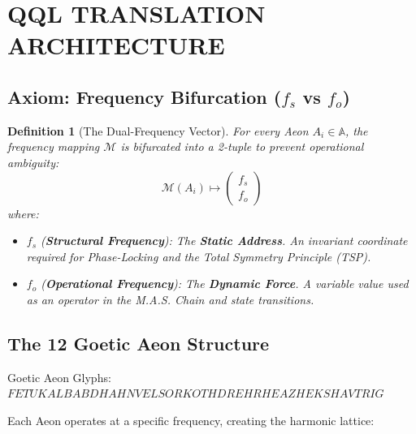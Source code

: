 \documentclass[11pt, letterpaper]{article}
\newcommand{\FETU}{\ensuremath{\mathop{\textnormal{\thaanafont\symbol{"23E3}}}}}   %
\newcommand{\KAL}{\ensuremath{\mathop{\textnormal{\symbolafont\symbol{"29C9}}}}}    %
\newcommand{\BABDH}{\ensuremath{\mathop{\textnormal{\symbolafont\symbol{"2316}}}}}   %
\newcommand{\AHN}{\ensuremath{\mathop{\textnormal{\symbolafont\symbol{"27C1}}}}}    %
\newcommand{\VEL}{\ensuremath{\mathop{\textnormal{\symbolafont\symbol{"2734}}}}}    %
\newcommand{\SOR}{\ensuremath{\mathop{\textnormal{\symbolafont\symbol{"229B}}}}}    %
\newcommand{\KOTH}{\ensuremath{\mathop{\textnormal{\symbolafont\symbol{"1F702}}}}}  %
\newcommand{\DREH}{\ensuremath{\mathop{\textnormal{\symbolafont\symbol{"29D7}}}}}   %
\newcommand{\RHEA}{\ensuremath{\mathop{\textnormal{\symbolafont\symbol{"2A54}}}}}   %
\newcommand{\ZHEK}{\ensuremath{\mathop{\textnormal{\symbolafont\symbol{"25C8}}}}}   %
\newcommand{\SHAV}{\ensuremath{\mathop{\textnormal{\symbolafont\symbol{"2742}}}}}   %
\newcommand{\TRIG}{\ensuremath{\mathop{\textnormal{\tifinaghfont\symbol{"2D63}}}}}    %
\def\FETU{FETU}%
\def\KAL{KAL}%
\def\BABDH{BABDH}%
\def\AHN{AHN}%
\def\VEL{VEL}%
\def\SOR{SOR}%
\def\KOTH{KOTH}%
\def\DREH{DREH}%
\def\RHEA{RHEA}%
\def\ZHEK{ZHEK}%
\def\SHAV{SHAV}%
\def\TRIG{TRIG}%
\newtheorem{definition}[theorem]{Definition}
\begin{document}
\section{QQL TRANSLATION ARCHITECTURE}\label{sec:partII}

\subsection{Axiom: Frequency Bifurcation ($f_s$ vs $f_o$)}\label{sec:2.1}
\label{sec:freq_bifurcation}

\begin{definition}[The Dual-Frequency Vector]
For every Aeon $A_i \in \mathbb{A}$, the frequency mapping $\mathcal{M}$ is bifurcated into a 2-tuple to prevent operational ambiguity:
\[ 
\mathcal{M}(A_i) \mapsto \begin{pmatrix} f_s \\ f_o \end{pmatrix} 
\]
where:
\begin{itemize}
    \item $f_s$ (\textbf{Structural Frequency}): The \textbf{Static Address}. An invariant coordinate required for Phase-Locking and the Total Symmetry Principle (TSP).
    \item $f_o$ (\textbf{Operational Frequency}): The \textbf{Dynamic Force}. A variable value used as an operator in the M.A.S. Chain and state transitions.
\end{itemize}
\end{definition}

\subsection{The 12 Goetic Aeon Structure}\label{sec:2.2}

Goetic Aeon Glyphs: $\FETU\KAL\BABDH\AHN\VEL\SOR\KOTH\DREH\RHEA\ZHEK\SHAV\TRIG$

Each Aeon operates at a specific frequency, creating the harmonic lattice:
\end{document}
